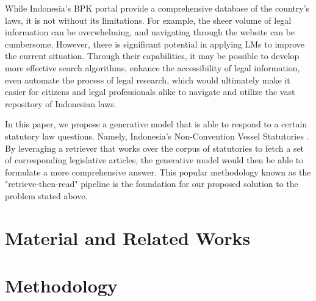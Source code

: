 \documentclass[conference]{IEEEtran}
\begin{document}
While Indonesia's BPK portal \cite{} provide a comprehensive database of the country's laws, it is not without
its limitations. For example, the sheer volume of legal information can be overwhelming, and navigating through
the website can be cumbersome. However, there is significant potential in applying LMs to improve the current
situation. Through their capabilities, it may be possible to develop more effective search algorithms, enhance
the accessibility of legal information, even automate the process of legal research, which would ultimately
make it easier for citizens and legal professionals alike to navigate and utilize the vast repository of
Indonesian laws.

In this paper, we propose a generative model that is able to respond to a certain statutory law questions.
Namely, Indonesia's Non-Convention Vessel Statutories \cite{}. By leveraging a retriever that works over the corpus
of statutories to fetch a set of corresponding legislative articles, the generative model would then be able
to formulate a more comprehensive answer. This popular methodology known as the "retrieve-then-read" pipeline
\cite{} is the foundation for our proposed solution to the problem stated above.



\section{Material and Related Works}

\section{Methodology}

\printbibliography
\end{document}
